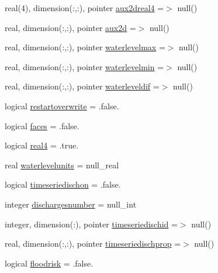 \begin{DoxyCompactItemize}
\item 
real(4), dimension(\+:,\+:), pointer \mbox{\hyperlink{structmodulehydrodynamic_1_1t__output_a75cbd4f4cf0a7abedc6f6ec5c91b331f}{aux2dreal4}} =$>$ null()
\item 
real, dimension(\+:,\+:), pointer \mbox{\hyperlink{structmodulehydrodynamic_1_1t__output_a3ece9bdb1da8040fc1c39e56aa85b0bf}{aux2d}} =$>$ null()
\item 
real, dimension(\+:,\+:), pointer \mbox{\hyperlink{structmodulehydrodynamic_1_1t__output_acac62170080b74ff81287bdb58444f4c}{waterlevelmax}} =$>$ null()
\item 
real, dimension(\+:,\+:), pointer \mbox{\hyperlink{structmodulehydrodynamic_1_1t__output_a2492b66df03e6dc45b3bbb8369f61bca}{waterlevelmin}} =$>$ null()
\item 
real, dimension(\+:,\+:), pointer \mbox{\hyperlink{structmodulehydrodynamic_1_1t__output_a8f74fae4e556be31561fa21d6cb27119}{waterleveldif}} =$>$ null()
\item 
logical \mbox{\hyperlink{structmodulehydrodynamic_1_1t__output_a5cf3f419012ba304da2ea1349ebd47bb}{restartoverwrite}} = .false.
\item 
logical \mbox{\hyperlink{structmodulehydrodynamic_1_1t__output_a2e6190d418b689a51117e955a916224e}{faces}} = .false.
\item 
logical \mbox{\hyperlink{structmodulehydrodynamic_1_1t__output_aa45f6176719359f1586893a36a0bf492}{real4}} = .true.
\item 
real \mbox{\hyperlink{structmodulehydrodynamic_1_1t__output_a00bee8701de7d4004c4a036a6c981b02}{waterlevelunits}} = null\+\_\+real
\item 
logical \mbox{\hyperlink{structmodulehydrodynamic_1_1t__output_ae6fdc8c88c30f938acf68f82cfbe5018}{timeseriedischon}} = .false.
\item 
integer \mbox{\hyperlink{structmodulehydrodynamic_1_1t__output_aaddb7565e45059c55a24d53d8ac8f90c}{dischargesnumber}} = null\+\_\+int
\item 
integer, dimension(\+:), pointer \mbox{\hyperlink{structmodulehydrodynamic_1_1t__output_ab128f366b94b8a3af36cb92df2a1a5e6}{timeseriedischid}} =$>$ null()
\item 
real, dimension(\+:,\+:), pointer \mbox{\hyperlink{structmodulehydrodynamic_1_1t__output_a13c4f35afe55b57b5bbede856351c1fd}{timeseriedischprop}} =$>$ null()
\item 
logical \mbox{\hyperlink{structmodulehydrodynamic_1_1t__output_aef24a070e2419d0227cf193e4259fdda}{floodrisk}} = .false.
\item 

\end{DoxyCompactItemize}
